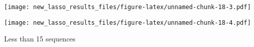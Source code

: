 \documentclass[
]{article}
\newenvironment{Shaded}{\begin{snugshade}}{\end{snugshade}}
\newcommand{\DataTypeTok}[1]{\textcolor[rgb]{0.13,0.29,0.53}{#1}}
\newcommand{\DecValTok}[1]{\textcolor[rgb]{0.00,0.00,0.81}{#1}}
\newcommand{\KeywordTok}[1]{\textcolor[rgb]{0.13,0.29,0.53}{\textbf{#1}}}
\newcommand{\NormalTok}[1]{#1}
\newcommand{\OperatorTok}[1]{\textcolor[rgb]{0.81,0.36,0.00}{\textbf{#1}}}
\newcommand{\StringTok}[1]{\textcolor[rgb]{0.31,0.60,0.02}{#1}}
\begin{document}
\texttt{[image: new\_lasso\_results\_files/figure-latex/unnamed-chunk-18-3.pdf]}

\begin{Shaded}
\end{Shaded}

\texttt{[image: new\_lasso\_results\_files/figure-latex/unnamed-chunk-18-4.pdf]}

Less than 15 sequences

\begin{Shaded}
\end{Shaded}
\end{document}

